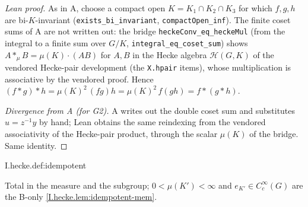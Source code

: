 \begin{proof}[Lean proof]
As in A, choose a compact open $K=K_1\cap K_2\cap K_3$ for which $f,g,h$ are bi-$K$-invariant (\texttt{exists\_bi\_invariant}, \texttt{compactOpen\_inf}). The finite coset sums of A are not written out: the bridge \texttt{heckeConv\_eq\_heckeMul} (from the integral to a finite sum over $G/K$, \texttt{integral\_eq\_coset\_sum}) shows $A*_\mu B=\mu(K)\cdot(AB)$ for $A,B$ in the Hecke algebra $\mathcal H(G,K)$ of the vendored Hecke-pair development (the \texttt{X.hpair} items), whose multiplication is associative by the vendored proof. Hence $(f*g)*h=\mu(K)^2\,(fg)h=\mu(K)^2\,f(gh)=f*(g*h)$.

\emph{Divergence from A (for G2).} A writes out the double coset sum and substitutes $u=z^{-1}y$ by hand; Lean obtains the same reindexing from the vendored associativity of the Hecke-pair product, through the scalar $\mu(K)$ of the bridge. Same identity.
\end{proof}

\begin{definition}
\end{definition}
\begin{tfformal}{I.hecke.def:idempotent}
\begin{tffidelity}
Total in the measure and the subgroup; $0<\mu(K')<\infty$ and $e_{K'}\in C_c^\infty(G)$ are the B-only \cref{I.hecke.lem:idempotent-mem}.
\end{tffidelity}
\end{tfformal}


